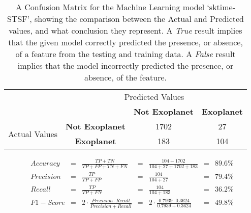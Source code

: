 
    \renewcommand{\arraystretch}{2}
    \renewcommand{\tabcolsep}{20.25pt}
    \vspace{-0.5cm}
    \begin{table}[ht]
    \begin{tabular}{cccc}
     & \multicolumn{3}{c}{Predicted Values} \\ \cline{3-4}
     & \multicolumn{1}{c|}{} & \multicolumn{1}{c|}{\textbf{Not Exoplanet}} & \multicolumn{1}{c|}{\textbf{Exoplanet}} \\ \cline{2-4}
    \multicolumn{1}{c|}{\multirow{2}{2.0cm}{Actual Values}} & \multicolumn{1}{c|}{\textbf{Not Exoplanet}} & \multicolumn{1}{c|}{1702} & \multicolumn{1}{c|}{27} \\ \cline{2-4}
    \multicolumn{1}{c|}{} & \multicolumn{1}{c|}{\textbf{Exoplanet}} & \multicolumn{1}{c|}{183} & \multicolumn{1}{c|}{104} \\ \cline{2-4}
    \end{tabular}
    \caption{A Confusion Matrix for the Machine Learning model `sktime-STSF', showing the comparison between the Actual and Predicted values, and what conclusion they represent. A \emph{True} result implies that the given model correctly predicted the presence, or absence, of a feature from the testing and training data. A \emph{False} result implies that the model incorrectly predicted the presence, or absence, of the feature.}
    \label{tab:sktime-STSFconfusionmatrix}
    \end{table}
    \vspace{-0.75cm}
    \label{eq:metrics-sktime-STSF}
    \begin{align*}
        Accuracy &= &\frac{TP + TN}{TP + FP + TN + FN} &= &\frac{104 + 1702}{104 + 27 + 1702 + 183} &= & 89.6\% \\
        Precision &= &\frac{TP}{TP + FP} &= &\frac{104}{104 + 27} &= & 79.4\% \\
        Recall &= &\frac{TP}{TP + FN} &= &\frac{104}{104 + 183} &= & 36.2\% \\
        F1-Score &= &2 \cdot \frac{Precision \cdot Recall}{Precision + Recall} &= &2 \cdot \frac{0.7939 \cdot 0.3624}{0.7939 + 0.3624} &= & 49.8\% \\
    \end{align*}
    \vspace{-1.75cm}
    \renewcommand{\arraystretch}{1}
    \renewcommand{\tabcolsep}{5.25pt}
    
